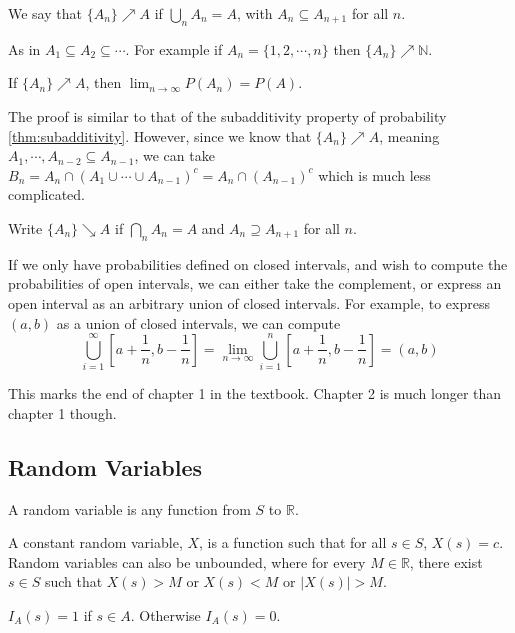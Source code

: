\begin{definition}
    We say that $\{ A_n \} \nearrow A$ if $\bigcup_n A_n = A$, with $A_n \subseteq A_{n+1}$ for all $n$.
\end{definition}

\noindent As in $A_1 \subseteq A_2 \subseteq \cdots$. For example if $A_n = \{ 1, 2, \cdots, n \}$ then $\{ A_n \} \nearrow \mathbb{N}$. 

\begin{theorem}
    If $\{ A_n \} \nearrow A$, then $\displaystyle \lim_{ n \to \infty } P(A_n) = P(A)$.
\end{theorem}

The proof is similar to that of the subadditivity property of probability \ref{thm:subadditivity}. However, since we know that $\{ A_n \} \nearrow A$, meaning $A_1, \cdots, A_{n-2} \subseteq A_{n-1}$, we can take $B_n = A_n \cap (A_1 \cup \cdots \cup A_{n-1})^c = A_n \cap (A_{n-1})^c$ which is much less complicated. 

\begin{definition}
    Write $\{ A_n \} \searrow A$ if $\bigcap_n A_n = A$ and $A_n \supseteq A_{n+1}$ for all $n$. 
\end{definition}

If we only have probabilities defined on closed intervals, and wish to compute the probabilities of open intervals, we can either take the complement, or express an open interval as an arbitrary union of closed intervals. For example, to express $(a, b)$ as a union of closed intervals, we can compute
\[
\bigcup_{i = 1}^\infty \left[a + \frac{1}{n}, b - \frac{1}{n}\right] = \lim_{ n \to \infty } \bigcup_{i = 1}^n \left[a + \frac{1}{n}, b - \frac{1}{n}\right] = (a, b)
\]

This marks the end of chapter 1 in the textbook. Chapter 2 is much longer than chapter 1 though.

\subsection{Random Variables}
\begin{definition}
A random variable is any function from $S$ to $\mathbb{R}$. 
\end{definition}

A constant random variable, $X$, is a function such that for all $s \in S$, $X(s) = c$. Random variables can also be unbounded, where for every $M \in \mathbb{R}$, there exist $s \in S$ such that $X(s) > M$ or $X(s) < M$ or $|X(s)| > M$. 

\begin{definition}
    $I_A(s) = 1$ if $s \in A$. Otherwise $I_A(s) = 0$.
\end{definition}

